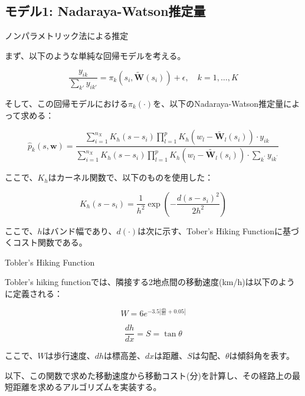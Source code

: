 \documentclass[xelatex, 8pt]{beamer}
\theoremstyle{plain}
\theoremstyle{definition}
\begin{document}
\subsection{モデル1: Nadaraya-Watson推定量}

\begin{frame}{ノンパラメトリック法による推定}

まず、以下のような単純な回帰モデルを考える。

$$
\frac{y_{ik}}{\sum_{k'}y_{ik'}} = \pi_k\left(s_i, \tilde{\boldsymbol{W}}(s_i)\right) + \epsilon, \quad k=1, \ldots, K
$$

そして、この回帰モデルにおける$\pi_k(\cdot)$を、以下のNadaraya-Watson推定量\cite{Kurisu2020-nh}によって求める：

$$
\hat{p}_k(s, \boldsymbol{w})=\frac{\sum_{i=1}^{n_X} K_h\left(s-s_i\right) \prod_{l=1}^{p}K_h(w_l - \tilde{\boldsymbol{W}_l}(s_i)) \cdot y_{i k}}{\sum_{i=1}^{n_X} K_h\left(s-s_i\right) \prod_{l=1}^{p}K_h(w_l - \tilde{\boldsymbol{W}_l}(s_i))\cdot \sum_{k^{\prime}} y_{i k^{\prime}}}
$$

ここで、$K_h$はカーネル関数で、以下のものを使用した：

$$
K_h\left(s-s_i\right)=\frac{1}{h^2} \exp \left(-\frac{d\left(s-s_i\right)^2}{2 h^2}\right)
$$

ここで、$h$はバンド幅であり、$d(\cdot)$は次に示す、Tober's Hiking Functionに基づくコスト関数である。

\end{frame}

\begin{frame}{Tobler's Hiking Function}

Tobler’s hiking function\cite{Tobler1999-gx}では、隣接する2地点間の移動速度(km/h)は以下のように定義される：

$$W = 6e^{-3.5\left|\frac{dh}{dx}+0.05\right|}$$

$$
\frac{dh}{dx} = S = \tan \theta
$$

ここで、$W$は歩行速度、$dh$は標高差、$dx$は距離、$S$は勾配、$\theta$は傾斜角を表す。

以下、この関数で求めた移動速度から移動コスト(分)を計算し、その経路上の最短距離を求めるアルゴリズムを実装する。

\end{frame}
\end{document}
